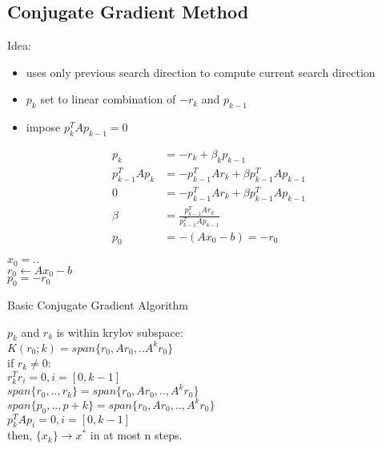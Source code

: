 \documentclass[8pt,letter]{article}
\begin{document}
\begin{multicols*}{2}
  \vfill\null
  \pagebreak
  
  \subsection{Conjugate Gradient Method}
  Idea:
  \begin{itemize}
  \item uses only previous search direction to compute current search direction
  \item $p_k$ set to linear combination of $-r_k$ and $p_{k-1}$
  \item impose $p_k^T A p_{k-1}=0$
  \end{itemize}
  \begin{align*}
    p_k &= -r_k + \beta_k p_{k-1}\\
    p_{k-1}^T A p_k &= -p_{k-1}^T A r_k + \beta p_{k-1}^T A p_{k-1}\\
    0 &= -p_{k-1}^T A r_k + \beta p_{k-1}^T A p_{k-1}\\
    \beta &= \frac{p_{k-1}^T A r_k}{p_{k-1}^T A p_{k-1}}\\
    p_0& = -(Ax_0-b)=-r_0
  \end{align*}
  \begin{algorithm}[H]
    $x_0 = ..$\\
    $r_0 \leftarrow Ax_0-b$\\
    $p_0 = -r_0$\\
    \caption{Basic Conjugate Gradient Algorithm\label{Algo_CGBasic}}
  \end{algorithm}
  $p_k$ and $r_k$ is within krylov subspace:\\
  $K(r_0;k) =span\{r_0, Ar_0, ..A^k r_0\}$\\
  if $r_k \not= 0$:\\
  $r_k^T r_i = 0, i=[0,k-1]$\\
  $span\{r_0,..,r_k\} = span\{r_0,Ar_0,..,A^k r_0\}$\\
  $span\{p_0,..,p+k\}=span\{r_0,Ar_0,..,A^k r_0\}$\\
  $p_k^T A p_i=0, i=[0,k-1]$\\
  then, $\{x_k\} \rightarrow x^*$ in at most n steps.\\


\end{multicols*}
\end{document}
